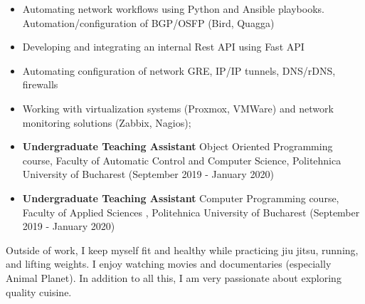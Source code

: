 \documentclass[10pt,a4paper,ragged2e,withhyper]{altacv}
\begin{document}
\begin{paracol}{2}
\divider

\begin{itemize}
\item Automating network workflows using Python and Ansible playbooks. Automation/configuration of BGP/OSFP (Bird, Quagga)
\item Developing and integrating an internal Rest API using Fast API 
\item Automating configuration of network GRE, IP/IP tunnels, \newline DNS/rDNS, firewalls
\item Working with virtualization systems (Proxmox, VMWare) and network monitoring solutions (Zabbix, Nagios);
\end{itemize}

\divider

\medskip

\switchcolumn




\begin{itemize}

\item {\textbf{Undergraduate Teaching Assistant} \newline Object Oriented Programming course, Faculty of Automatic Control and Computer Science, Politehnica University of Bucharest} {(September 2019 - January 2020)}
\item {\textbf{Undergraduate Teaching Assistant} \newline Computer Programming course, Faculty of Applied Sciences , Politehnica University of Bucharest} {(September 2019 - January 2020)}
\end{itemize}
\medskip


Outside of work, I keep myself fit and healthy while practicing jiu jitsu, running, and lifting weights. I enjoy watching movies and documentaries (especially Animal Planet). In addition to all this, I am very passionate about exploring quality cuisine.

\end{paracol}
\newpage
\end{document}
